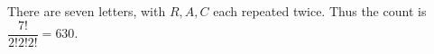 There are seven letters, with $ R,A,C $ each repeated twice. Thus the count is $\dfrac{7!}{2!2!2!}=\boxed{630}$.
